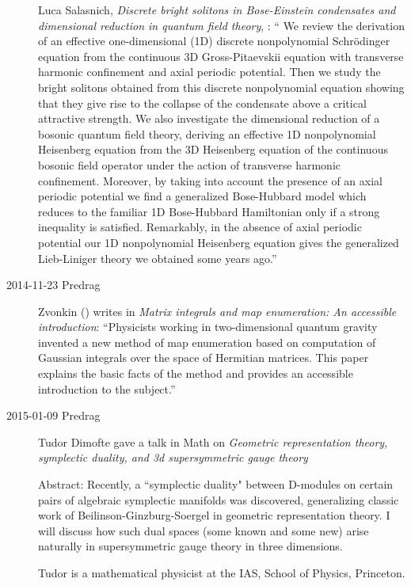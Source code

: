 \begin{description}
Luca Salasnich,
 \emph{Discrete bright solitons in Bose-Einstein condensates and dimensional
  reduction in quantum field theory}, :
`` We  review the derivation of an effective one-dimensional (1D) discrete
nonpolynomial Schr\"odinger equation from the continuous 3D Gross-Pitaevskii
equation with transverse harmonic confinement and axial periodic potential.
Then we study the bright solitons obtained from this discrete nonpolynomial
equation showing that they give rise to the collapse of the condensate above a
critical attractive strength. We also investigate the dimensional reduction of
a bosonic quantum field theory, deriving an effective 1D nonpolynomial
Heisenberg equation from the 3D Heisenberg equation of the continuous bosonic
field operator under the action of transverse harmonic confinement. Moreover,
by taking into account the presence of an axial periodic potential we find a
generalized Bose-Hubbard model which reduces to the familiar 1D Bose-Hubbard
Hamiltonian only if a strong inequality is satisfied. Remarkably, in the
absence of axial periodic potential our 1D nonpolynomial Heisenberg equation
gives the generalized Lieb-Liniger theory we obtained some years ago.''

\item[2014-11-23 Predrag]
Zvonkin
()
writes in
{\em Matrix integrals and map enumeration: {An} accessible introduction}:
``Physicists working in two-dimensional quantum gravity invented a new
method of map enumeration based on computation of Gaussian integrals over
the space of Hermitian matrices. This paper explains the basic facts of
the method and provides an accessible introduction to the subject.''

\item[2015-01-09 Predrag]

Tudor Dimofte gave a talk in Math on
{\em Geometric representation theory, symplectic duality, and 3d
supersymmetric gauge theory}

Abstract: Recently, a ``symplectic duality" between D-modules on certain
pairs of algebraic symplectic manifolds was discovered, generalizing
classic work of Beilinson-Ginzburg-Soergel in geometric representation
theory. I will discuss how such dual spaces (some known and some new) arise
naturally in supersymmetric gauge theory in three dimensions.

Tudor is a mathematical physicist at the IAS,
School of Physics, Princeton.


\end{description}
